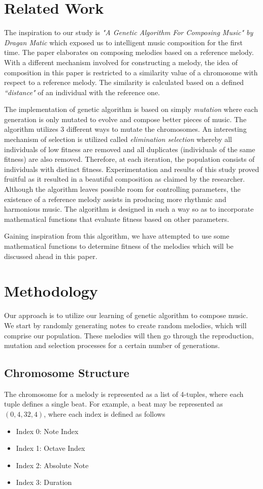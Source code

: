 \documentclass[conference]{IEEEtran}
\begin{document}
\section{Related Work}
The inspiration to our study is \textit{"A Genetic Algorithm For Composing Music" by Dragan Matic} \cite{b1} which exposed us to intelligent music composition for the first time. The paper elaborates on composing melodies based on a reference melody. With a different mechanism involved for constructing a melody, the idea of composition in this paper is restricted to a similarity value of a chromosome with respect to a reference melody. The similarity is calculated based on a defined \textit{``distance"} of an individual with the reference one.

The implementation of genetic algorithm is based on simply \textit{mutation} where each generation is only mutated to evolve and compose better pieces of music. The algorithm utilizes 3 different ways to mutate the chromosomes. An interesting mechanism of selection is utilized called \textit{elimination selection} whereby all individuals of low fitness are removed and all duplicates (individuals of the same fitness) are also removed. Therefore, at each iteration, the population consists of individuals with distinct fitness. Experimentation and results of this study proved fruitful as it resulted in a beautiful composition as claimed by the researcher. Although the algorithm leaves possible room for controlling parameters, the existence of a reference melody assists in producing more rhythmic and harmonious music. The algorithm is designed in such a way so as to incorporate mathematical functions that evaluate fitness based on other parameters.

Gaining inspiration from this algorithm, we have attempted to use some mathematical functions to determine fitness of the melodies which will be discussed ahead in this paper.

\section{Methodology}
Our approach is to utilize our learning of genetic algorithm to compose music. We start by randomly generating notes to create random melodies, which will comprise our population. These melodies will then go through the reproduction, mutation and selection processes for a certain number of generations.

\subsection{Chromosome Structure}
The chromosome for a melody is represented as a list of 4-tuples, where each tuple defines a single beat. For example, a beat may be represented as $(0, 4, 32, 4)$, where each index is defined as follows
\begin{itemize}
	\item Index 0: Note Index
	\item Index 1: Octave Index
	\item Index 2: Absolute Note
	\item Index 3: Duration
\end{itemize}
\end{document}
